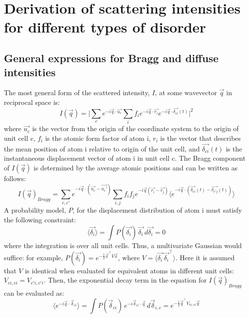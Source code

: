 \documentclass{article}
\begin{document}
\section{Derivation of scattering intensities for different types of disorder}

\subsection{General expressions for Bragg and diffuse intensities}
The most general form of the scattered intensity, $I$, at some wavevector $\vec{q}$ in reciprocal space is:
\begin{equation}
I(\vec{q}) = \vert \sum\limits_{c} e^{-i \vec{q} \cdot \vec{u_c} } \sum\limits_{i} f_i e^{-i \vec{q} \cdot \vec{r_i}} e^{-i \vec{q} \cdot \vec{\delta_{ci}}(t)} \vert ^2
\end{equation}
where $\vec{u_c}$ is the vector from the origin of the coordinate system to the origin of unit cell c, $f_i$ is the atomic form factor of atom i, $r_i$ is the vector that describes the mean position of atom i relative to origin of the unit cell, and $\vec{\delta_{ci}}(t)$ is the instantaneous displacement vector of atom i in unit cell c. The Bragg component of $I(\vec{q})$ is determined by the average atomic positions and can be written as follows:
\begin{equation}
I(\vec{q})_{Bragg} = \sum\limits_{c,c'} e^{-i \vec{q} \cdot (\vec{u_c} - \vec{u_c'})} \sum\limits_{i,j} f_i f_j e^{-i \vec{q} (\vec{r_i} - \vec{r_j})} \langle e^{-i \vec{q} \cdot (\vec{\delta_{ci}}(t) - \vec{\delta_{c'j}}(t))} \rangle
\end{equation}
A probability model, $P$, for the displacement distribution of atom i must satisfy the following constraint:
\begin{equation}
\langle \vec{\delta_{i}} \rangle = \int P(\vec{\delta_{i}})\, \vec{\delta_{i}} \, d\vec{\delta_{i}} = 0
\end{equation}
where the integration is over all unit cells. Thus, a multivariate Gaussian would suffice: for example, $P(\vec{\delta_{i}}) =e^{-\frac{1}{2} \vec{x}^\intercal V \vec{x}}$, where $V = \langle \vec{\delta_{i}} \, \vec{\delta_{i}}^\intercal \rangle$. Here it is assumed that $V$ is identical when evaluated for equivalent atoms in different unit cells: $V_{ci,ci} = V_{c'i,c'i}$.
Then, the exponential decay term in the equation for $I(\vec{q})_{Bragg}$ can be evaluated as\footnotemark:
\begin{equation}
\langle e^{-i {\vec{q}} \cdot \vec{\delta}_{ci} } \rangle = \int P(\vec{\delta}_{ci})\, e^{-i \vec{\delta}_{ci} \cdot {\vec{q}}} \, d\vec{\delta}_{i,c} = e^{-\frac{1}{2} \vec{q}^\intercal V_{ci,ci} \vec{q} }
\end{equation}
\end{document}
